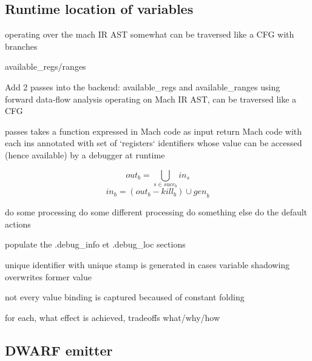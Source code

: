 \subsection{Runtime location of variables}

operating over the mach IR AST
somewhat can be traversed like a CFG with branches

available\_regs/ranges

Add 2 passes into the backend: available\_regs and available\_ranges
using forward data-flow analysis operating on Mach IR AST, can be traversed like
a CFG

passes takes a function expressed in Mach code as input
return Mach code with each ins annotated with set of `registers` identifiers
whose value can be accessed (hence available) by a debugger at runtime

\[
    \textit{out}_{b} = \bigcup_{s \in succ_{b}} \textit{in}_{s}
\]
\[
    \textit{in}_{b} = (\textit{out}_{b} - \textit{kill}_{b}) \cup \textit{gen}_{b}
\]



\begin{algorithmic}[1]
    \State do some processing
    \State do some different processing
    \State do something else
    \Else
    \State do the default actions
    \EndIf
\end{algorithmic}

populate the  .debug\_info et .debug\_loc sections

unique identifier with unique stamp is generated in cases variable shadowing overwrites former value

not every value binding is captured becaused of constant folding


for each, what effect is achieved, tradeoffs
what/why/how

\subsection{DWARF emitter}

